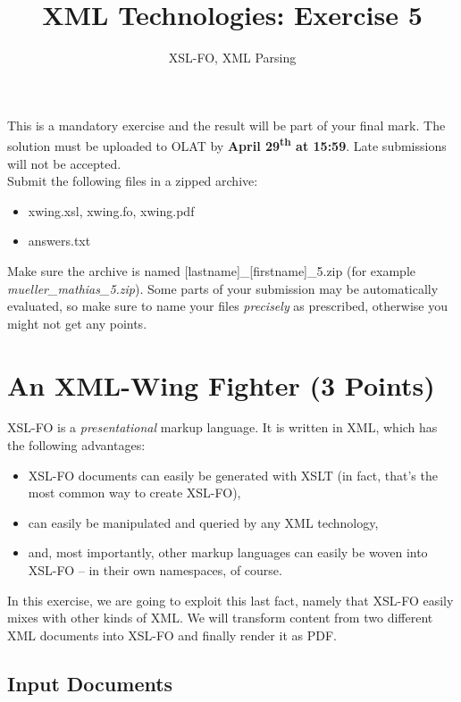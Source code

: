 \documentclass[a4paper, 12pt]{scrartcl}
\title{XML Technologies: Exercise 5}
\date{}
\subtitle{XSL-FO, XML Parsing}
\begin{document}
\maketitle\vspace{-12ex}

\noindent This is a mandatory exercise and the result will be part of your final mark. The solution must be uploaded to OLAT by \textbf{April 29\textsuperscript{th} at 15:59}. Late submissions will not be accepted.\\


\noindent Submit the following files in a zipped archive:
\begin{itemize}
\item xwing.xsl, xwing.fo, xwing.pdf
\item answers.txt
\end{itemize}

\noindent Make sure the archive is named [lastname]\_[firstname]\_5.zip (for example \textit{mueller\_mathias\_5.zip}). Some parts of your submission may be automatically evaluated, so make sure to name your files \textit{precisely} as prescribed, otherwise you might not get any points.

\section{An XML-Wing Fighter (3 Points)}

XSL-FO is a \textit{presentational} markup language. It is written in XML, which has the following advantages:

\begin{itemize}
\item XSL-FO documents can easily be generated with XSLT (in fact, that's the most common way to create XSL-FO),
\item can easily be manipulated and queried by any XML technology,
\item and, most importantly, other markup languages can easily be woven into XSL-FO -- in their own namespaces, of course.
\end{itemize}

\noindent In this exercise, we are going to exploit this last fact, namely that XSL-FO easily mixes with other kinds of XML. We will transform content from two different XML documents into XSL-FO and finally render it as PDF.

\subsection{Input Documents}
\end{document}
